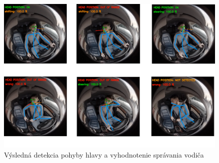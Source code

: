 \documentclass[slovak,master,dept460,male,cpp,cpdeclaration]{diploma}
\begin{document}
\begin{figure}[H]
	\centering
	\includegraphics[width=1\textwidth]{Figures/final.png}
	\caption{Výsledná detekcia pohyby hlavy a vyhodnotenie správania vodiča}
	\label{fig:final}
\end{figure}




\newpage
\end{document}
